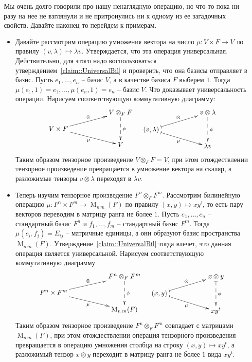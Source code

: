 Мы очень долго говорили про нашу ненаглядную операцию, но что-то пока ни разу на нее не взглянули и не притронулись ни к одному из ее загадочных свойств.
Давайте  наконец-то перейдем к примерам.

\begin{itemize}
\item Давайте рассмотрим операцию умножения вектора на число $\mu \colon V\times F \to V$ по правилу $(v, \lambda)\mapsto \lambda v$.
Утверждается, что эта операция универсальная.
Действительно, для этого надо воспользоваться утверждением~\ref{claim::UniversalBil} и проверить, что она базисы отправляет в базис.
Пусть $e_1,\ldots,e_n$ -- базис $V$, а в качестве базиса $F$ выберем $1$.
Тогда $\mu(e_1, 1) = e_1, \ldots, \mu(e_n, 1) = e_n$ -- базис $V$.
Что доказывает универсальность операции.
Нарисуем соответствующую коммутативную диаграмму:
\[
\xymatrix@R=10pt{
	{}&{}&{V\otimes_F F}\ar@{-->}[dd]^{\phi}\\
	{V\times F}\ar[urr]^{\otimes}\ar[drr]_{\mu}&{}&{}\\
	{}&{}&{V}\\
}
\quad
\xymatrix@R=10pt{
	{}&{}&{v\otimes \lambda}\ar@{|-->}[dd]^{\phi}\\
	{(v,\lambda)}\ar@{|->}[urr]^{\otimes}\ar@{|->}[drr]_{\mu}&{}&{}\\
	{}&{}&{\lambda v}\\
}
\]
Таким образом тензорное произведение $V\otimes_F F = V$, при этом отождествлении тензорное произведение превращается в умножение вектора на скаляр, а разложимые тензоры $v\otimes \lambda$ переходят в $\lambda v$.

\item Теперь изучим тензорное произведение $F^n \otimes_F F^m$.
Рассмотрим билинейную операцию $\mu\colon F^n\times F^m \to \operatorname{M}_{n\,m}(F) $ по правилу $(x, y)\mapsto xy^t$, то есть пару векторов переводим в матрицу ранга не более $1$.
Пусть $e_1,\ldots,e_n$ -- стандартный базис $F^n$ и $f_1,\ldots,f_m$ -- стандартный базис $F^m$.
Тогда $\mu(e_i, f_j) = E_{ij}$ -- матричные единицы, а они образуют базис пространства $\operatorname{M}_{n\,m}(F)$.
Утверждение~\ref{claim::UniversalBil} тогда влечет, что данная операция является универсальной.
Нарисуем соответствующую коммутативную диаграмму
\[
\xymatrix@R=10pt{
	{}&{}&{F^n\otimes_F F^m}\ar@{-->}[dd]^{\phi}\\
	{F^n\times F^m}\ar[urr]^{\otimes}\ar[drr]_{\mu}&{}&{}\\
	{}&{}&{\operatorname{M}_{n\,m}(F)}\\
}
\quad
\xymatrix@R=10pt{
	{}&{}&{x\otimes y}\ar@{|-->}[dd]^{\phi}\\
	{(x, y)}\ar@{|->}[urr]^{\otimes}\ar@{|->}[drr]_{\mu}&{}&{}\\
	{}&{}&{x y^t}\\
}
\]
Таким образом тензорное произведение $F^n \otimes_F F^m$ совпадает с матрицами $\operatorname{M}_{n\,m}(F)$, при этом отождествлении операция тензорного произведения превращается в операцию умножения столбца на строку $(x, y)\mapsto xy^t$, а разложимый тензор $x\otimes y$ переходит в матрицу ранга не более $1$ вида $xy^t$.


\end{itemize}
